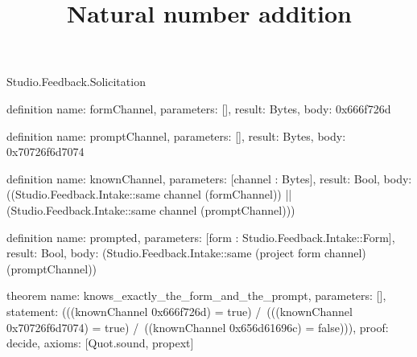 \begin{lexlean}{Studio.Feedback.Solicitation}
\title{Natural number addition}
\begin{semanticmodule}
definition{
  name: formChannel,
  parameters: [],
  result: Bytes,
  body: 0x666f726d
}

definition{
  name: promptChannel,
  parameters: [],
  result: Bytes,
  body: 0x70726f6d7074
}

definition{
  name: knownChannel,
  parameters: [channel : Bytes],
  result: Bool,
  body: ((Studio.Feedback.Intake::same channel (formChannel)) || (Studio.Feedback.Intake::same channel (promptChannel)))
}

definition{
  name: prompted,
  parameters: [form : Studio.Feedback.Intake::Form],
  result: Bool,
  body: (Studio.Feedback.Intake::same (project form channel) (promptChannel))
}

theorem{
  name: knows_exactly_the_form_and_the_prompt,
  parameters: [],
  statement: (((knownChannel 0x666f726d) = true) /\ (((knownChannel 0x70726f6d7074) = true) /\ ((knownChannel 0x656d61696c) = false))),
  proof: decide{},
  axioms: [Quot.sound, propext]
}
\end{semanticmodule}
\end{lexlean}
